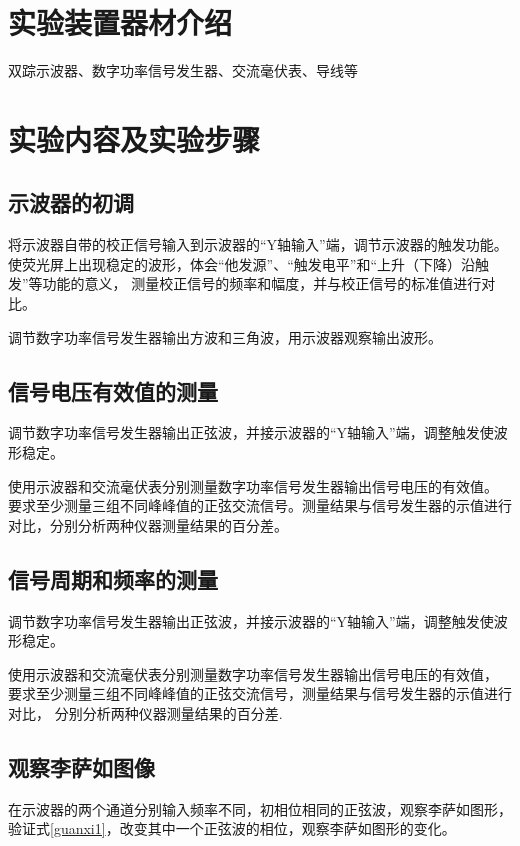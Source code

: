 \documentclass{ctexart}
\begin{document}
\section{实验装置器材介绍}
双踪示波器、数字功率信号发生器、交流毫伏表、导线等

\section{实验内容及实验步骤}
  \subsection{示波器的初调}
  将示波器自带的校正信号输入到示波器的“Y轴输入”端，调节示波器的触发功能。
  使荧光屏上出现稳定的波形，体会“他发源”、“触发电平”和“上升（下降）沿触发”等功能的意义，
  测量校正信号的频率和幅度，并与校正信号的标准值进行对比。

  调节数字功率信号发生器输出方波和三角波，用示波器观察输出波形。

  \subsection{信号电压有效值的测量}
  调节数字功率信号发生器输出正弦波，并接示波器的“Y轴输入”端，调整触发使波形稳定。

  使用示波器和交流毫伏表分别测量数字功率信号发生器输出信号电压的有效值。
  要求至少测量三组不同峰峰值的正弦交流信号。测量结果与信号发生器的示值进行对比，分别分析两种仪器测量结果的百分差。

  \subsection{信号周期和频率的测量}
  调节数字功率信号发生器输出正弦波，并接示波器的“Y轴输入”端，调整触发使波形稳定。

  使用示波器和交流毫伏表分别测量数字功率信号发生器输出信号电压的有效值，
  要求至少测量三组不同峰峰值的正弦交流信号，测量结果与信号发生器的示值进行对比，
  分别分析两种仪器测量结果的百分差.

  \subsection{观察李萨如图像}
  在示波器的两个通道分别输入频率不同，初相位相同的正弦波，观察李萨如图形，
  验证式\ref{guanxi1}，改变其中一个正弦波的相位，观察李萨如图形的变化。
\newpage
\end{document}
